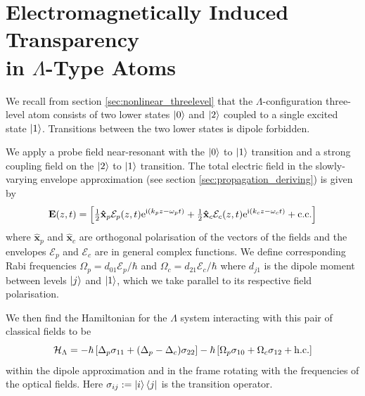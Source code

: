 \section[Electromagnetically Induced Transparency in $\Lambda$-Type Atoms]
  {Electromagnetically Induced Transparency\\ in $\Lambda$-Type Atoms}
  \label{sec:polaritons_eit}

    We recall from section \ref{sec:nonlinear_threelevel} that the
    $\Lambda$-configuration three-level atom consists of two lower states
    $\Ket{0}$ and $\Ket{2}$ coupled to a single excited state $\Ket{1}$.
    Transitions between the two lower states is dipole forbidden.

    We apply a probe field near-resonant with the $\Ket{0}$ to $\Ket{1}$
    transition and a strong coupling field on the $\Ket{2}$ to $\Ket{1}$
    transition. The total electric field in the slowly-varying envelope
    approximation (see section \ref{sec:propagation_deriving}) is given by 
    \begin{equation}
      \mathbf{E}(z,t) = \left[ \tfrac{1}{2} \mathbf{\hat{x}}_p 
        \mathcal{E}_p(z,t) \mathrm{e}^{\mathrm{i}(k_p z - \omega_p t)} + 
        \tfrac{1}{2} \mathbf{\hat{x}}_c \mathcal{E}_c(z,t) \mathrm{e}^{\mathrm{i}(k_c z -
        \omega_c t)} + \mathrm{c.c.} \right]
      \label{eqn:lambda_field}
    \end{equation}
   where $\mathbf{\hat{x}}_p$ and $\mathbf{\hat{x}}_c$ are orthogonal
    polarisation of the vectors of the fields and the envelopes $\mathcal{E}_p$
    and $\mathcal{E}_c$ are in general complex functions. We define
    corresponding Rabi frequencies $\Omega_p = d_{01}\mathcal{E}_p/\hbar$ and
    $\Omega_c = d_{21}\mathcal{E}_c/\hbar$ where $d_{j1}$ is the dipole moment
    between levels $\Ket{j}$ and $\Ket{1}$, which we take parallel to its
    respective field polarisation.

    We then find the Hamiltonian for the $\Lambda$ system interacting with this
    pair of classical fields to be\cite{Fleischhauer2005}
    \begin{equation}
      \mathcal{H}_\mathrm{\Lambda} = -\hbar \left[ \Delta_p \sigma_{11} + 
        (\Delta_p - \Delta_c) \sigma_{22} \right] - \hbar \left[ \Omega_p 
        \sigma_{10} + \Omega_c \sigma_{12} + \mathrm{h.c.} \right]
      \label{eqn:lamda_hamiltonian}
    \end{equation}
    within the dipole approximation and in the frame rotating with the
    frequencies of the optical fields. Here $\sigma_{ij} := \Ket{i}\Bra{j}$ is
    the transition operator.

